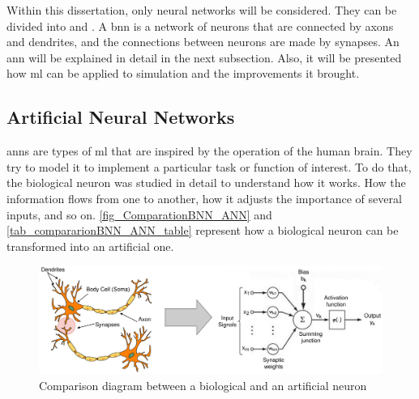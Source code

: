 Within this dissertation, only neural networks will be considered. They can be divided into  and . 
A \gls{bnn} is a network of neurons that are connected by axons and dendrites, and the connections between neurons are made by synapses. 
An \gls{ann} will be explained in detail in the next subsection. Also, it will be presented how \gls{ml} can be applied to simulation and the 
improvements it brought. 

\subsection{Artificial Neural Networks}

\glspl{ann} are types of \gls{ml} that are inspired by the operation of the human brain. They try to model it to implement a particular task or 
function of interest. To do that, the biological neuron was studied in detail to understand how it works. How the information flows from one 
to another, how it adjusts the importance of several inputs, and so on. \autoref{fig_ComparationBNN_ANN} and 
\autoref{tab_compararionBNN_ANN_table} represent how a biological neuron can be transformed into an artificial one.

\begin{figure}[H]
	\centering
 	\includegraphics[width=0.9\linewidth]{Images/ComparationBNN_ANN.png}
 	\caption{Comparison diagram between a biological and an artificial neuron}
	 \label{fig_ComparationBNN_ANN}
\end{figure}

